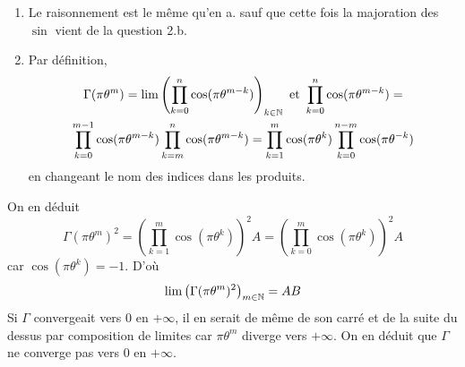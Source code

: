 \begin{enumerate}
\begin{enumerate}
 \item Le raisonnement est le même qu'en a. sauf que cette fois la majoration des $\sin$ vient de la question 2.b.
 \item Par définition, 
\begin{multline*}
 \Gamma(\pi \theta^m)=\lim \left( \prod_{k=0}^{n}\cos(\pi\theta^{m-k})\right)_{k\in \mathbb{N}}
\text{ et } 
\prod_{k=0}^{n}\cos(\pi\theta^{m-k}) = \\
\prod_{k=0}^{m-1}\cos(\pi\theta^{m-k})\prod_{k=m}^{n}\cos(\pi\theta^{m-k}) 
= \prod_{k=1}^{m}\cos(\pi\theta^{k})\prod_{k=0}^{n-m}\cos(\pi\theta^{-k})
\end{multline*}
en changeant le nom des indices dans les produits.
\end{enumerate}
On en déduit 
\begin{displaymath}
 \Gamma(\pi \theta^m)^2 = \left( \prod_{k=1}^{m}\cos(\pi\theta^{k})\right)^2 A = \left( \prod_{k=0}^{m}\cos(\pi\theta^{k})\right)^2 A
\end{displaymath}
car $\cos(\pi\theta^{k}) = -1$. D'où
\begin{displaymath}
 \lim \left( \Gamma(\pi \theta^m)^2\right)_{m\in \mathbb{N}} = AB
\end{displaymath}
Si $\Gamma$ convergeait vers $0$ en $+\infty$, il en serait de même de son carré et de la suite du dessus par composition de limites car $\pi \theta^m$ diverge vers $+\infty$. On en déduit que $\Gamma$ ne converge pas vers $0$ en $+\infty$.
\end{enumerate}
